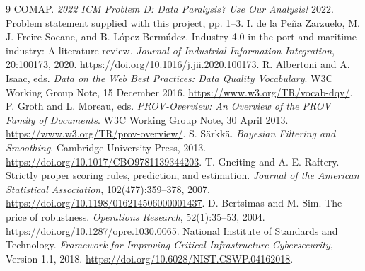 \clearpage
\renewcommand{\refname}{\bi{References}{参考文献}}
\begin{thebibliography}{9}
 COMAP. \emph{2022 ICM Problem D: Data Paralysis? Use Our Analysis!} 2022. Problem statement supplied with this project, pp. 1--3.
 I. de la Pe\~na Zarzuelo, M. J. Freire Soeane, and B. L\'opez Berm\'udez. Industry 4.0 in the port and maritime industry: A literature review. \emph{Journal of Industrial Information Integration}, 20:100173, 2020. \url{https://doi.org/10.1016/j.jii.2020.100173}.
 R. Albertoni and A. Isaac, eds. \emph{Data on the Web Best Practices: Data Quality Vocabulary}. W3C Working Group Note, 15 December 2016. \url{https://www.w3.org/TR/vocab-dqv/}.
 P. Groth and L. Moreau, eds. \emph{PROV-Overview: An Overview of the PROV Family of Documents}. W3C Working Group Note, 30 April 2013. \url{https://www.w3.org/TR/prov-overview/}.
 S. S\"arkk\"a. \emph{Bayesian Filtering and Smoothing}. Cambridge University Press, 2013. \url{https://doi.org/10.1017/CBO9781139344203}.
 T. Gneiting and A. E. Raftery. Strictly proper scoring rules, prediction, and estimation. \emph{Journal of the American Statistical Association}, 102(477):359--378, 2007. \url{https://doi.org/10.1198/016214506000001437}.
 D. Bertsimas and M. Sim. The price of robustness. \emph{Operations Research}, 52(1):35--53, 2004. \url{https://doi.org/10.1287/opre.1030.0065}.
 National Institute of Standards and Technology. \emph{Framework for Improving Critical Infrastructure Cybersecurity}, Version 1.1, 2018. \url{https://doi.org/10.6028/NIST.CSWP.04162018}.
\end{thebibliography}\par
{}
\par
{}\par
